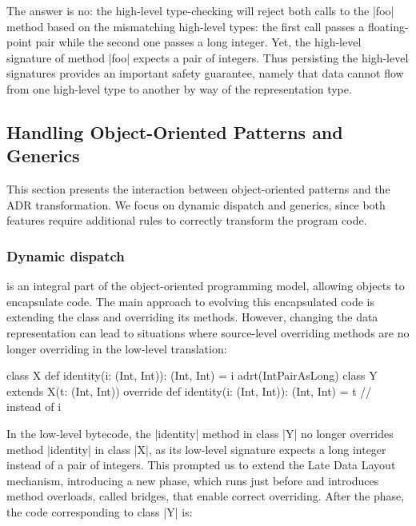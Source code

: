 The answer is no: the high-level type-checking will reject both calls to the |foo| method based on the mismatching high-level types: the first call passes a floating-point pair while the second one passes a long integer. Yet, the high-level signature of method |foo| expects a pair of integers. Thus persisting the high-level signatures provides an important safety guarantee, namely that data cannot flow from one high-level type to another by way of the representation type.





\subsection{Handling Object-Oriented Patterns and Generics}
\label{sec:ildl:generics}

This section presents the interaction between object-oriented patterns and the ADR transformation. We focus on dynamic dispatch and generics, since both features require additional rules to correctly transform the program code.

\subsubsection{Dynamic dispatch}
is an integral part of the object-oriented programming model, allowing objects to encapsulate code. The main approach to evolving this encapsulated code is extending the class and overriding its methods. However, changing the data representation can lead to situations where source-level overriding methods are no longer overriding in the low-level translation:

\begin{lstlisting-nobreak}
class X {
  def identity(i: (Int, Int)): (Int, Int) = i
}
adrt(IntPairAsLong) {
  class Y extends X(t: (Int, Int)) {
    override def identity(i: (Int, Int)): (Int, Int) = t // instead of i
  }
}
\end{lstlisting-nobreak}

In the low-level bytecode, the |identity| method in class |Y| no longer overrides method |identity| in class |X|, as its low-level signature expects a long integer instead of a pair of integers. This prompted us to extend the Late Data Layout mechanism, introducing a new \bridge{} phase, which runs just before \coerce{} and introduces method overloads, called bridges, that enable correct overriding. After the \inject{} phase, the code corresponding to class |Y| is:

